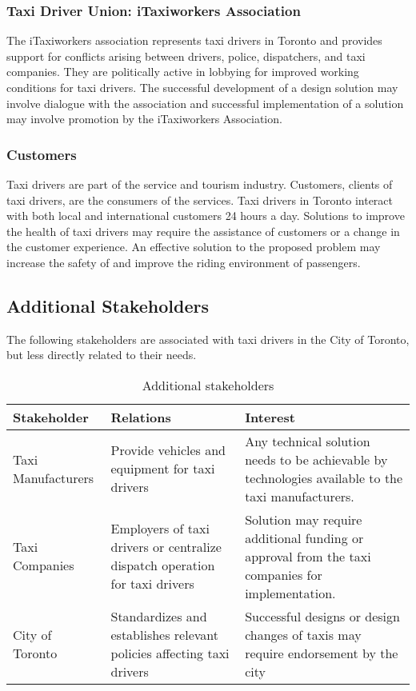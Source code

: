 \documentclass[11pt]{article}
\begin{document}
\subsubsection{Taxi Driver Union: iTaxiworkers Association}
The iTaxiworkers association represents taxi drivers in Toronto and provides 
support for conflicts arising between drivers, police, dispatchers, and 
taxi companies. They are politically active in lobbying for improved 
working conditions for taxi drivers. The successful development of a 
design solution may involve dialogue with the association and
successful implementation of a solution may involve promotion by the 
iTaxiworkers Association\cite{itaxi}. 


\subsubsection{Customers}
Taxi drivers are part of the service and tourism industry. Customers,
clients of taxi drivers, are the consumers of the services. Taxi 
drivers in Toronto interact with both local and international customers 
24 hours a day. Solutions to improve the health of taxi drivers 
may require the assistance of customers or a change in the customer 
experience. An effective solution to the proposed problem may increase 
the safety of and improve the riding environment of passengers. 
 
 
\subsection{Additional Stakeholders}

The following stakeholders are associated with taxi drivers in the City 
of Toronto, but less directly related to their needs. 

\begin{table}[h]
  \centering
  \caption{Additional stakeholders}
    \begin{tabular}{ l p{5cm} p{5cm}}
    Stakeholder & Relations &	Interest \\ \hline
    Taxi Manufacturers & Provide vehicles and equipment for taxi drivers	& 
    Any technical solution needs to be achievable by technologies available 
    to the taxi manufacturers. \\ 
    Taxi Companies & Employers of taxi drivers or centralize dispatch 
    operation for taxi drivers	& Solution may require additional funding 
    or approval from the taxi companies for implementation. \\
    City of Toronto & Standardizes and establishes relevant policies 
    affecting taxi drivers \cite{CityofToronto}	& Successful designs or design changes of  
    taxis may require endorsement by the city  \\
    \end{tabular}
\end{table}
\end{document}
